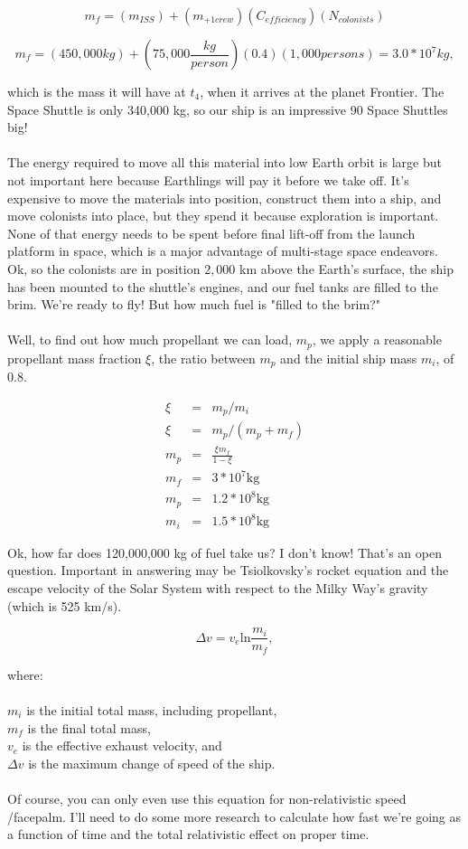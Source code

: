 \documentclass[12pt]{article}
\newcommand{\tab}{\hspace*{2em}}
\begin{document}
$$m_f = (m_{ISS}) + (m_{+1crew}) (C_{efficiency}) (N_{colonists})$$

$$m_f = (450,000 kg) + (75,000 \frac{kg}{person}) (0.4) (1,000 persons) = 3.0 * 10^7 kg,$$

which is the mass it will have at $t_4$, when it arrives at the planet Frontier. The Space Shuttle is only 340,000 kg, so our ship is an impressive 90 Space Shuttles big!\\
\\
The energy required to move all this material into low Earth orbit is large but not important here because Earthlings will pay it before we take off. It's expensive to move the materials into position, construct them into a ship, and move colonists into place, but they spend it because exploration is important. None of that energy needs to be spent before final lift-off from the launch platform in space, which is a major advantage of multi-stage space endeavors.\\
Ok, so the colonists are in position $2,000$ km above the Earth's surface, the ship has been mounted to the shuttle's engines, and our fuel tanks are filled to the brim. We're ready to fly! But how much fuel is "filled to the brim?"\\
\\
Well, to find out how much propellant we can load, $m_p$, we apply a reasonable propellant mass fraction $\xi$, the ratio between $m_p$ and the initial ship mass $m_i$, of 0.8.

\begin{eqnarray}
\xi &=& m_p / m_i \nonumber\\
\xi &=& m_p / (m_p + m_f) \nonumber\\
m_p &=& \frac{\xi m_f}{1-\xi} \nonumber\\
m_f &=& 3 *10^7 \mathrm{kg}\\
m_p &=& 1.2*10^8 \mathrm{kg} \\
m_i &=& 1.5*10^8\mathrm{kg}
\end{eqnarray}

Ok, how far does 120,000,000 kg of fuel take us? I don't know! That's an open question. Important in answering may be Tsiolkovsky's rocket equation and the escape velocity of the Solar System with respect to the Milky Way's gravity (which is 525 km/s).

$$\Delta v = v_e\mathrm{ln}\frac{m_i}{m_f},$$

where:\\
\\
\tab $m_i$ is the initial total mass, including propellant,\\
\tab $m_f$ is the final total mass,\\
\tab $v_e$ is the effective exhaust velocity, and\\
\tab $\Delta v$ is the maximum change of speed of the ship.\\
\\
Of course, you can only even use this equation for non-relativistic speed /facepalm. I'll need to do some more research to calculate how fast we're going as a function of time and the total relativistic effect on proper time.
\end{document}
